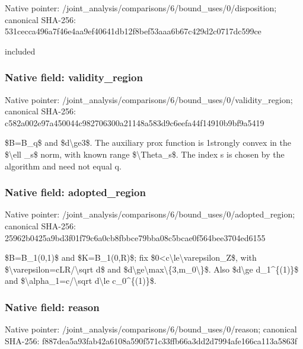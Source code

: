 \documentclass[10pt,a4paper]{article}
\begin{document}
Native pointer: /joint\_analysis/comparis\allowbreak{}ons/6/bound\_uses/0/dispo\allowbreak{}sition; canonical SHA-256: 531cecca496a7f46e4aa9ef4\allowbreak{}0641db12f8bef53aaa6b67c4\allowbreak{}29d2c0717dc599ce


included


\subsubsection{Native field: validity\_region}


Native pointer: /joint\_analysis/comparis\allowbreak{}ons/6/bound\_uses/0/valid\allowbreak{}ity\_region; canonical SHA-256: c582a002e97a450044c98270\allowbreak{}6300a21148a583d9c6eefa44\allowbreak{}f14910b9bf9a5419


\$B=B\_q\$ and \$d\textbackslash{}ge3\$. The auxiliary prox function is 1strongly convex in the \$\textbackslash{}ell \_s\$ norm, with known range \$\textbackslash{}Theta\_s\$. The index s is chosen by the algorithm and need not equal q.


\subsubsection{Native field: adopted\_region}


Native pointer: /joint\_analysis/comparis\allowbreak{}ons/6/bound\_uses/0/adopt\allowbreak{}ed\_region; canonical SHA-256: 25962b0425a9bd3f01f79c6a\allowbreak{}0cb8fbbce79bba08c5bcae0f\allowbreak{}564bee3704ed6155


\$B=B\_1(0,1)\$ and \$K=B\_1(0,R)\$; fix \$0<c\textbackslash{}le\textbackslash{}varepsilon\_Z\$, with \$\textbackslash{}varepsilon=cLR/\textbackslash{}sqrt d\$ and \$d\textbackslash{}ge\textbackslash{}max\textbackslash{}\{3,m\_0\textbackslash{}\}\$. Also \$d\textbackslash{}ge d\_1\textasciicircum{}\{(1)\}\$ and \$\textbackslash{}alpha\_1=c/\textbackslash{}sqrt d\textbackslash{}le c\_0\textasciicircum{}\{(1)\}\$.


\subsubsection{Native field: reason}


Native pointer: /joint\_analysis/comparis\allowbreak{}ons/6/bound\_uses/0/reaso\allowbreak{}n; canonical SHA-256: f887dea5a93fab42a6108a59\allowbreak{}0f571c33ffb66a3dd2d7994a\allowbreak{}fe166ca113a5863f
\end{document}
